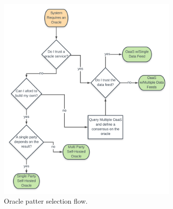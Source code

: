 \begin{figure}[t]
  \begin{center}
    \leavevmode
    \includegraphics[width=0.8\textwidth]{figures/oracle-pattern-flow.png}
    \caption{Oracle patter selection flow.}
    \label{fig:/figures/oracle-pattern-flow}
  \end{center}
\end{figure}


